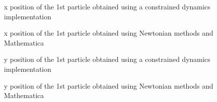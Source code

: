 \begin{figure}
	\begin{center}
	\end{center}
    \caption{\label{Fig:x1_constr_double_pendulum}x position of the 1st particle
    obtained using a constrained dynamics implementation}
	\begin{center}
	\end{center}
    \caption{\label{Fig:x1_double_pendulum}x position of the 1st particle
    obtained using Newtonian methods and Mathematica}
\end{figure}

\begin{figure}
	\begin{center}
	\end{center}
    \caption{\label{Fig:y1_constr_double_pendulum}y position of the 1st particle
    obtained using a constrained dynamics implementation}
	\begin{center}
	\end{center}
    \caption{\label{Fig:y1_double_pendulum}y position of the 1st particle
    obtained using Newtonian methods and Mathematica}
\end{figure}

